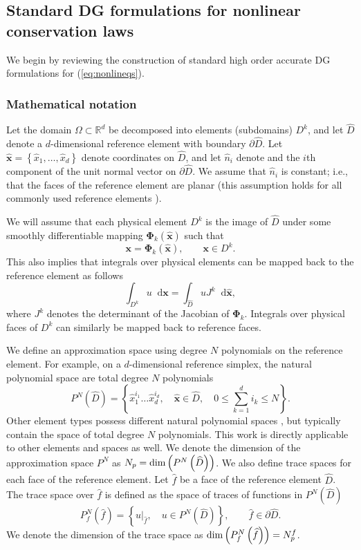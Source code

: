 \documentclass[preprint,10pt]{article}
\theoremstyle{definition}
\theoremstyle{lemma}
\theoremstyle{theorem}
\theoremstyle{assumption}
\renewcommand{\hat}{\widehat}
\newcommand{\LRp}[1]{\left( #1 \right)}
\newcommand{\LRc}[1]{\left\{ #1 \right\}}
\newcommand*\diff[1]{\mathop{}\!{\mathrm{d}#1}} %
\begin{document}
\subsection{Standard DG formulations for nonlinear conservation laws}

We begin by reviewing the construction of standard high order accurate DG formulations for (\ref{eq:nonlineqs}).  

\subsubsection{Mathematical notation}

Let the domain $\Omega \subset \mathbb{R}^d$ be decomposed into elements (subdomains) $D^k$, and let $\hat{D}$ denote a $d$-dimensional reference element with boundary $\partial \hat{D}$.  Let $\hat{\bm{x}} = \LRc{\hat{x}_1,\ldots,\hat{x}_d}$ denote coordinates on $\hat{D}$, and let $\hat{n}_i$ denote and the $i$th component of the unit normal vector on $\partial \hat{D}$.  We assume that $\hat{n}_i$ is constant; i.e., that the faces of the reference element are planar (this assumption holds for all commonly used reference elements \cite{chan2015gpu}).  

We will assume that each physical element $D^k$ is the image of $\hat{D}$ under some smoothly differentiable mapping $\bm{\Phi}_k(\hat{\bm{x}})$ such that
\[
\bm{x} = \bm{\Phi}_k(\hat{\bm{x}}), \qquad \bm{x}\in D^k.
\]
This also implies that integrals over physical elements can be mapped back to the reference element as follows
\[
\int_{D^k} u \diff{\bm{x}} = \int_{\hat{D}} u J^k\diff{\hat{\bm{x}}}, 
\]
where $J^k$ denotes the determinant of the Jacobian of $\bm{\Phi}_k$.  Integrals over physical faces of $D^k$ can similarly be mapped back to reference faces.


We define an approximation space using degree $N$ polynomials on the reference element.  For example, on a $d$-dimensional reference simplex, the natural polynomial space are total degree $N$ polynomials 
\[
P^N\LRp{\widehat{D}} = \LRc{\hat{x}_1^{i_1}\ldots\hat{x}_d^{i_d}, \quad \hat{\bm{x}} \in \widehat{D}, \quad 0\leq \sum_{k=1}^d i_k \leq N}.
\]
Other element types possess different natural polynomial spaces \cite{chan2015gpu}, but typically contain the space of total degree $N$ polynomials.  This work is directly applicable to other elements and spaces as well.  We denote the dimension of the approximation space $P^N$ as $N_p = {\rm dim}\LRp{P^N\LRp{\widehat{D}}}$.  We also define trace spaces for each face of the reference element.  Let $\hat{f}$ be a face of the reference element $\hat{D}$.  The trace space over $\hat{f}$ is defined as the space of traces of functions in $P^N\LRp{\hat{D}}$
\[
P^N_f \LRp{\hat{f}} = \LRc{ \left.u\right|_{\hat{f}}, \quad u \in P^N\LRp{\hat{D}}}, \qquad \hat{f}\in \partial\hat{D}.
\]
We denote the dimension of the trace space as ${\rm dim}\LRp{P^N_f\LRp{\hat{f}}} = N^f_p$.
\end{document}
